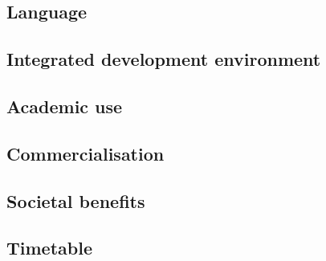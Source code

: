 \subsection{Language}

\subsection{Integrated development environment}

\subsection{Academic use}

\subsection{Commercialisation}

\subsection{Societal benefits}

\subsection{Timetable}
